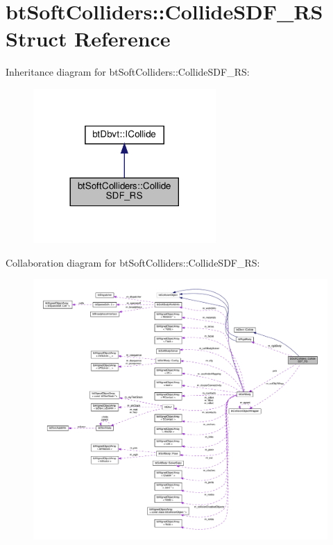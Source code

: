 \hypertarget{structbtSoftColliders_1_1CollideSDF__RS}{}\section{bt\+Soft\+Colliders\+:\+:Collide\+S\+D\+F\+\_\+\+RS Struct Reference}
\label{structbtSoftColliders_1_1CollideSDF__RS}


Inheritance diagram for bt\+Soft\+Colliders\+:\+:Collide\+S\+D\+F\+\_\+\+RS\+:
\nopagebreak
\begin{figure}[H]
\begin{center}
\leavevmode
\includegraphics[width=197pt]{structbtSoftColliders_1_1CollideSDF__RS__inherit__graph}
\end{center}
\end{figure}


Collaboration diagram for bt\+Soft\+Colliders\+:\+:Collide\+S\+D\+F\+\_\+\+RS\+:
\nopagebreak
\begin{figure}[H]
\begin{center}
\leavevmode
\includegraphics[width=350pt]{structbtSoftColliders_1_1CollideSDF__RS__coll__graph}
\end{center}
\end{figure}
